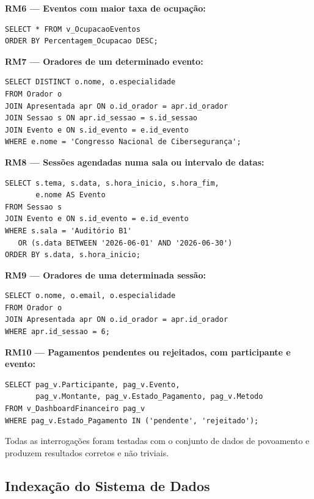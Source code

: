 \documentclass[runningheads]{llncs}
\begin{document}
                \textbf{RM6 — Eventos com maior taxa de ocupação:}
                \begin{verbatim}
SELECT * FROM v_OcupacaoEventos
ORDER BY Percentagem_Ocupacao DESC;
                \end{verbatim}

                \textbf{RM7 — Oradores de um determinado evento:}
                \begin{verbatim}
SELECT DISTINCT o.nome, o.especialidade
FROM Orador o
JOIN Apresentada apr ON o.id_orador = apr.id_orador
JOIN Sessao s ON apr.id_sessao = s.id_sessao
JOIN Evento e ON s.id_evento = e.id_evento
WHERE e.nome = 'Congresso Nacional de Cibersegurança';
                \end{verbatim}

                \textbf{RM8 — Sessões agendadas numa sala ou intervalo de datas:}
                \begin{verbatim}
SELECT s.tema, s.data, s.hora_inicio, s.hora_fim,
       e.nome AS Evento
FROM Sessao s
JOIN Evento e ON s.id_evento = e.id_evento
WHERE s.sala = 'Auditório B1'
   OR (s.data BETWEEN '2026-06-01' AND '2026-06-30')
ORDER BY s.data, s.hora_inicio;
                \end{verbatim}

                \textbf{RM9 — Oradores de uma determinada sessão:}
                \begin{verbatim}
SELECT o.nome, o.email, o.especialidade
FROM Orador o
JOIN Apresentada apr ON o.id_orador = apr.id_orador
WHERE apr.id_sessao = 6;
                \end{verbatim}

                \textbf{RM10 — Pagamentos pendentes ou rejeitados, com participante e evento:}
                \begin{verbatim}
SELECT pag_v.Participante, pag_v.Evento,
       pag_v.Montante, pag_v.Estado_Pagamento, pag_v.Metodo
FROM v_DashboardFinanceiro pag_v
WHERE pag_v.Estado_Pagamento IN ('pendente', 'rejeitado');
                \end{verbatim}

                Todas as interrogações foram testadas com o conjunto de dados de povoamento e produzem resultados corretos e não triviais.

                \subsection{Indexação do Sistema de Dados}
\end{document}
